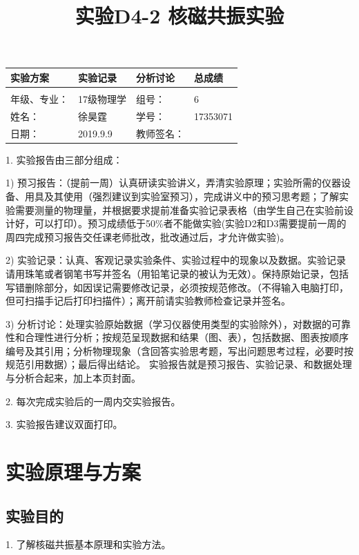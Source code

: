 \documentclass{ctexart}
\title{实验D4-2 核磁共振实验}
\begin{document}
\maketitle

\begin{tabular}{|p{8em}|p{8em}|p{8em}|p{5em}|}
\hline
		\large{实验方案} &\large{实验记录}  &\large{分析讨论} &\large{总成绩}\\
		\hline
		        &          &          &  \\
	    \hline
	\hline 
	年级、专业： &17级物理学 &组号：& 6 \\
	\hline
	姓名：& 徐昊霆 &学号：&17353071  \\
	\hline
	日期：& 2019.9.9 &教师签名： &  \\
    \hline	
        \end{tabular}
        
        1. 实验报告由三部分组成：
        
        1) 预习报告：（提前一周）认真研读实验讲义，弄清实验原理；实验所需的仪器设备、用具及其使用（强烈建议到实验室预习），完成讲义中的预习思考题；了解实验需要测量的物理量，并根据要求提前准备实验记录表格（由学生自己在实验前设计好，可以打印）。预习成绩低于50\%者不能做实验(实验D2和D3需要提前一周的周四完成预习报告交任课老师批改，批改通过后，才允许做实验)。
        
        2) 实验记录：认真、客观记录实验条件、实验过程中的现象以及数据。实验记录请用珠笔或者钢笔书写并签名（用铅笔记录的被认为无效）。保持原始记录，包括写错删除部分，如因误记需要修改记录，必须按规范修改。（不得输入电脑打印，但可扫描手记后打印扫描件）；离开前请实验教师检查记录并签名。
        
    3) 分析讨论：处理实验原始数据（学习仪器使用类型的实验除外），对数据的可靠性和合理性进行分析；按规范呈现数据和结果（图、表），包括数据、图表按顺序编号及其引用；分析物理现象（含回答实验思考题，写出问题思考过程，必要时按规范引用数据）；最后得出结论。
    实验报告就是预习报告、实验记录、和数据处理与分析合起来，加上本页封面。
    
    2. 每次完成实验后的一周内交实验报告。
    
    3. 实验报告建议双面打印。
\newpage
\tableofcontents
\newpage
\section{实验原理与方案}
\subsection{实验目的}
1. 了解核磁共振基本原理和实验方法。
\end{document}
